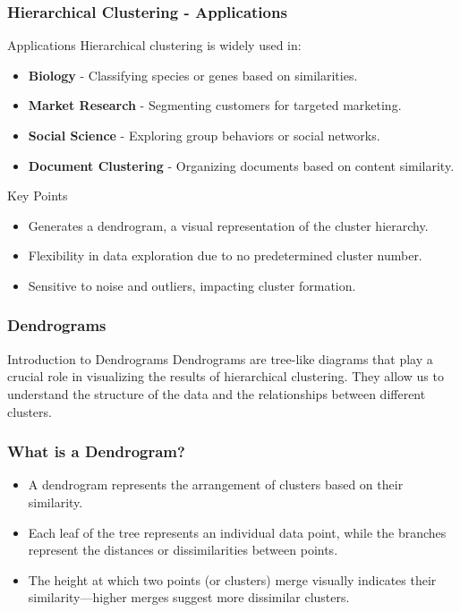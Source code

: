 \documentclass[aspectratio=169]{beamer}
\begin{document}
\begin{frame}[fragile]
    \frametitle{Hierarchical Clustering - Applications}
    \begin{block}{Applications}
        Hierarchical clustering is widely used in:
        \begin{itemize}
            \item \textbf{Biology} - Classifying species or genes based on similarities.
            \item \textbf{Market Research} - Segmenting customers for targeted marketing.
            \item \textbf{Social Science} - Exploring group behaviors or social networks.
            \item \textbf{Document Clustering} - Organizing documents based on content similarity.
        \end{itemize}
    \end{block}

    \begin{block}{Key Points}
        \begin{itemize}
            \item Generates a dendrogram, a visual representation of the cluster hierarchy.
            \item Flexibility in data exploration due to no predetermined cluster number.
            \item Sensitive to noise and outliers, impacting cluster formation.
        \end{itemize}
    \end{block}
\end{frame}

\begin{frame}[fragile]
    \frametitle{Dendrograms}
    \begin{block}{Introduction to Dendrograms}
        Dendrograms are tree-like diagrams that play a crucial role in visualizing the results of hierarchical clustering. They allow us to understand the structure of the data and the relationships between different clusters.
    \end{block}
\end{frame}

\begin{frame}[fragile]
    \frametitle{What is a Dendrogram?}
    \begin{itemize}
        \item A dendrogram represents the arrangement of clusters based on their similarity.
        \item Each leaf of the tree represents an individual data point, while the branches represent the distances or dissimilarities between points.
        \item The height at which two points (or clusters) merge visually indicates their similarity—higher merges suggest more dissimilar clusters.
    \end{itemize}
\end{frame}
\end{document}
